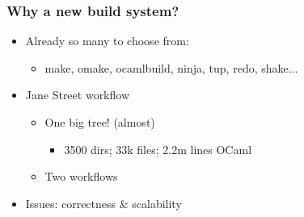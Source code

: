 \documentclass{beamer}
\begin{document}








\begin{frame}[fragile]
\frametitle{Why a new build system?}
\begin{itemize}
\item Already so many to choose from:
\begin{itemize}
\item make, omake, ocamlbuild, ninja, tup, redo, shake...
\end{itemize}
\item Jane Street workflow
\begin{itemize}
\item One big tree! (almost)
\begin{itemize}
\item 3500 dirs; 33k files; 2.2m lines OCaml
\end{itemize}
\item Two workflows
\end{itemize}
\item Issues: correctness \& scalability
\end{itemize}
\end{frame}
\end{document}
